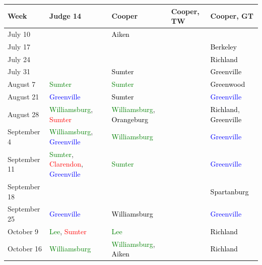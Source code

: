 \documentclass[11pt, oneside]{article}   	%
\newcommand{\rowgroup}[1]{\hspace{-1em}#1}
\theoremstyle{ModifiedStyle}
\begin{document}
\begin{table}[H]
	\centering
	\vspace{-11mm}
	\hspace*{-16mm}
	\setlength\tabcolsep{0pt} %
	{\footnotesize
		\begin{tabular}{L{23mm}C{55mm}C{38mm}C{38mm}C{38mm}}
			\toprule
			\rule{0pt}{2.3ex} Week & Judge 14 & Cooper & Cooper, TW & Cooper, GT \\
			\midrule
			\rule{0pt}{2.3ex} July 10 & & \textcolor{black}{Aiken} & &\\
			\rule{0pt}{2.3ex} July 17 & & & &  \textcolor{black}{Berkeley}\\\rule{0pt}{2.3ex} July 24 & & & &  \textcolor{black}{Richland}\\
			\rule{0pt}{2.3ex} July 31 & & \textcolor{black}{Sumter} & &  \textcolor{black}{Greenville}\\\rule{0pt}{2.3ex} August 7 &  \textcolor{green}{Sumter} & \textcolor{green}{Sumter} & &  \textcolor{black}{Greenwood}\\
			\rule{0pt}{2.3ex} August 21 &  \textcolor{blue}{Greenville} & \textcolor{black}{Sumter} & &  \textcolor{blue}{Greenville}\\
			\rule{0pt}{2.3ex} August 28 &  \textcolor{green}{Williamsburg}, \textcolor{red}{Sumter} & \textcolor{green}{Williamsburg}, \textcolor{black}{Orangeburg} & &  \textcolor{black}{Richland}, \textcolor{black}{Greenville}\\
			\rule{0pt}{2.3ex} September 4 &  \textcolor{green}{Williamsburg}, \textcolor{blue}{Greenville} & \textcolor{green}{Williamsburg} & &  \textcolor{blue}{Greenville}\\
			\rule{0pt}{2.3ex} September 11 &  \textcolor{green}{Sumter}, \textcolor{red}{Clarendon}, \textcolor{blue}{Greenville} & \textcolor{green}{Sumter} & &  \textcolor{blue}{Greenville}\\
			\rule{0pt}{2.3ex} September 18 & & & &  \textcolor{black}{Spartanburg}\\
			\rule{0pt}{2.3ex} September 25 &  \textcolor{blue}{Greenville} & \textcolor{black}{Williamsburg} & &  \textcolor{blue}{Greenville}\\
			\rule{0pt}{2.3ex} October 9 &  \textcolor{green}{Lee}, \textcolor{red}{Sumter} & \textcolor{green}{Lee} & &  \textcolor{black}{Richland}\\
			\rule{0pt}{2.3ex} October 16 &  \textcolor{green}{Williamsburg} & \textcolor{green}{Williamsburg}, \textcolor{black}{Aiken} & &  \textcolor{black}{Richland}\\

\end{tabular}}
\end{table}
\end{document}
